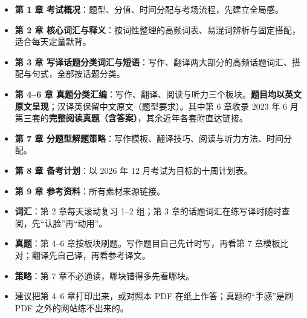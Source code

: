 \begin{itemize}
  \item \textbf{第 1 章 考试概况}：题型、分值、时间分配与考场流程，先建立全局感。
  \item \textbf{第 2 章 核心词汇与释义}：按词性整理的高频词表、易混词辨析与固定搭配，适合每天定量默背。
  \item \textbf{第 3 章 写译话题分类词汇与短语}：写作、翻译两大部分的高频话题词汇、搭配与句式，全部按话题分类。
  \item \textbf{第 4--6 章 真题分类汇编}：写作、翻译、阅读与听力三个板块。\textbf{题目均以英文原文呈现}；汉译英保留中文原文（题型要求）。其中第 6 章收录 2023 年 6 月第三套的\textbf{完整阅读真题（含答案）}，其余近年各套附直达链接。
  \item \textbf{第 7 章 分题型解题策略}：写作模板、翻译技巧、阅读与听力方法、时间分配。
  \item \textbf{第 8 章 备考计划}：以 2026 年 12 月考试为目标的十周计划表。
  \item \textbf{第 9 章 参考资料}：所有素材来源链接。
\end{itemize}

\begin{tipbox}[怎么用这份指南]
\begin{itemize}
  \item \textbf{词汇}：第 2 章每天滚动复习 1--2 组；第 3 章的话题词汇在练写译时随时查阅，先“认脸”再“动用”。
  \item \textbf{真题}：第 4--6 章按板块刷题。写作题目自己先计时写，再看第 7 章模板比对；翻译先自己译，再看参考译文。
  \item \textbf{策略}：第 7 章不必通读，哪块错得多先看哪块。
  \item 建议把第 4--6 章打印出来，或对照本 PDF 在纸上作答；真题的“手感”是刷 PDF 之外的网站练不出来的。
\end{itemize}
\end{tipbox}
